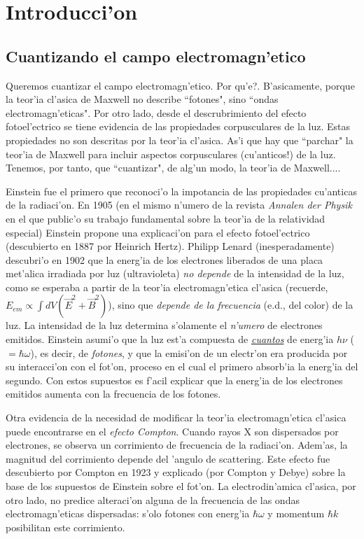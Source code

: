 \chapter{Introducci'on}

\section{Cuantizando el campo electromagn'etico}

Queremos cuantizar el campo electromagn'etico. \textquestiondown Por
qu'e?. B'asicamente, porque la teor'ia cl'asica de Maxwell  no describe
``fotones", sino ``ondas electromagn'eticas". Por otro lado, desde el
descrubrimiento del efecto fotoel'ectrico se tiene evidencia de las
propiedades corpusculares de la luz. Estas propiedades no son
descritas por la teor'ia cl'asica. As'i que hay que ``parchar" la
teor'ia de Maxwell para incluir aspectos corpusculares (cu'anticos!)
de la luz. Tenemos, por tanto, que ``cuantizar", de alg'un modo, la
teor'ia de Maxwell....

Einstein fue el primero que reconoci'o la impotancia de las
propiedades cu'anticas de la radiaci'on. En 1905 (en el mismo n'umero
de la revista \textit{Annalen der Physik} en el que public'o su
trabajo fundamental sobre la teor'ia de la relatividad especial)
Einstein propone una explicaci'on para el efecto fotoel'ectrico
(descubierto en 1887 por Heinrich Hertz). Philipp Lenard
(inesperadamente) descubri'o en 1902 que la energ'ia de los electrones
liberados de una placa met'alica irradiada por luz (ultravioleta)
\textit{no depende} de la intensidad de la luz, como se esperaba a
partir de la teor'ia electromagn'etica cl'asica (recuerde,
$E_{em}\propto \int dV (\vec{E}^2+\vec{B}^2)$), sino que
\textit{depende de la frecuencia} (e.d., del color) de la luz. La
intensidad de la luz determina s'olamente el \textit{n'umero} de
electrones emitidos. Einstein asumi'o que la luz est'a compuesta de
\textit{\underline{cuantos}} de energ'ia $h\nu$ ($=\hbar\omega$), es
decir, de \textit{fotones}, y que la emisi'on de un electr'on era
producida por su interacci'on con el fot'on, proceso en el cual el
primero absorb'ia la energ'ia del segundo. Con estos supuestos es
f'acil explicar que la energ'ia de los electrones emitidos aumenta con
la frecuencia de los fotones.

Otra evidencia de la necesidad de modificar la teor'ia
electromagn'etica cl'asica puede encontrarse en el \textit{efecto
Compton}. Cuando rayos X son dispersados por electrones, se observa
un corrimiento de frecuencia de la radiaci'on. Adem'as, la magnitud
del corrimiento depende del 'angulo de scattering. Este efecto fue
descubierto por Compton en 1923 y explicado (por Compton y Debye)
sobre la base de los supuestos de Einstein sobre el fot'on. La
electrodin'amica cl'asica, por otro lado, no predice alteraci'on alguna
de la frecuencia de las ondas electromagn'eticas dispersadas: s'olo
fotones con energ'ia $\hbar\omega$ y momentum $\hbar k$ posibilitan
este corrimiento.


